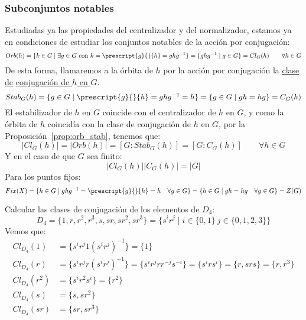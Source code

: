 \subsubsection{Subconjuntos notables}
\noindent
Estudiadas ya las propiedades del centralizador y del normalizador, estamos ya en condiciones de estudiar los conjuntos notables de la acción por conjugación:
\begin{equation*}
    Orb(h) = \{k\in G \mid \exists g\in G \text{\ con\ } k = \prescript{g}{}{h} = ghg^{-1}\} = \{ghg^{-1}\mid g\in G\} = Cl_G(h) \qquad \forall h\in G
\end{equation*}
De esta forma, llamaremos a la órbita de $h$ por la acción por conjugación la \underline{clase de} \underline{conjugación de $h$ en $G$}.
\begin{equation*}
    Stab_G(h) = \{g\in G \mid \prescript{g}{}{h} = ghg^{-1} = h\} = \{g \in G \mid gh = hg\} = C_G(h)
\end{equation*}
El estabilizador de $h$ en $G$ coincide con el centralizador de $h$ en $G$, y como la órbita de $h$ coincidía con la clase de conjugación de $h$ en $G$, por la Proposición~\ref{prop:orb_stab}, tenemos que:
\begin{equation*}
    |Cl_G(h)| = |Orb(h)| = [G:Stab_G(h)] = [G:C_G(h)] \qquad \forall h\in G
\end{equation*}
Y en el caso de que $G$ sea finito:
\begin{equation*}
    |Cl_G(h)| |C_G(h)| = |G|
\end{equation*}
Para los puntos fijos:
\begin{equation*}
    Fix(X) = \{h\in G \mid ghg^{-1} = \prescript{g}{}{h} = h \quad \forall g\in G\} = \{h\in G\mid gh = hg \quad \forall g\in G\} = Z(G)
\end{equation*}

\begin{ejemplo}
    Calcular las clases de conjugación de los elementos de $D_4$:
    \begin{equation*}
        D_4 = \{1,r,r^2, r^3, s, sr, sr^2, sr^3\} = \{s^i r^j \mid i \in \{0,1\}\ j \in \{0,1,2,3\}\}
    \end{equation*}
    Vemos que:
    \begin{align*}
        Cl_{D_4}(1) &= \{s^ir^j 1 {(s^i r^j)}^{-1}\} = \{1\} \\
        Cl_{D_4}(r) &= \{s^ir^j r {(s^i r^j)}^{-1}\} = \{s^i r^j rr^{-j}s^{-i}\} = \{s^i r s^{i}\} = \{r, srs\} = \{r,r^3\} \\ %
        Cl_{D_4}(r^2) &= \{s^i r^2 s^i\} = \{r^2\} \\
        Cl_{D_4}(s) &= \{s,sr^2\} \\
        Cl_{D_4}(sr) &= \{sr,sr^3\} 
    \end{align*}
\end{ejemplo}

